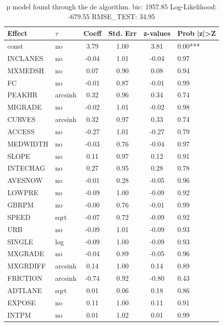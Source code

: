 \begin{table}
	\caption{p model found through the de algorithm. bic: 1957.85 Log-Likelihood: -679.55 RMSE_TEST: 34.95}
	\begin{center}
		\begin{tabular}{|l|l|c|c|c|l|}
			\hline
			Effect & $\tau$ & Coeff & Std. Err & z-values & Prob |z|>Z \\
			\hline
			const & no & 3.79 & 1.00 & 3.81 & 0.00*** \\
			\hline
			INCLANES & no & -0.04 & 1.01 & -0.04 & 0.97 \\
			\hline
			MXMEDSH & no & 0.07 & 0.90 & 0.08 & 0.94 \\
			\hline
			FC & no & -0.01 & 0.87 & -0.01 & 0.99 \\
			\hline
			PEAKHR & arcsinh & 0.32 & 0.96 & 0.34 & 0.74 \\
			\hline
			MIGRADE & no & -0.02 & 1.01 & -0.02 & 0.98 \\
			\hline
			CURVES & arcsinh & 0.32 & 0.97 & 0.33 & 0.74 \\
			\hline
			ACCESS & no & -0.27 & 1.01 & -0.27 & 0.79 \\
			\hline
			MEDWIDTH & no & -0.03 & 0.76 & -0.04 & 0.97 \\
			\hline
			SLOPE & no & 0.11 & 0.97 & 0.12 & 0.91 \\
			\hline
			INTECHAG & no & 0.27 & 0.95 & 0.28 & 0.78 \\
			\hline
			AVESNOW & no & -0.01 & 0.28 & -0.05 & 0.96 \\
			\hline
			LOWPRE & no & -0.09 & 1.00 & -0.09 & 0.92 \\
			\hline
			GBRPM & no & -0.00 & 0.76 & -0.01 & 0.99 \\
			\hline
			SPEED & sqrt & -0.07 & 0.72 & -0.09 & 0.92 \\
			\hline
			URB & no & -0.09 & 1.01 & -0.09 & 0.93 \\
			\hline
			SINGLE & log & -0.09 & 1.00 & -0.09 & 0.93 \\
			\hline
			MXGRADE & no & -0.04 & 0.89 & -0.05 & 0.96 \\
			\hline
			MXGRDIFF & arcsinh & 0.14 & 1.00 & 0.14 & 0.89 \\
			\hline
			FRICTION & arcsinh & -0.74 & 0.92 & -0.80 & 0.43 \\
			\hline
			ADTLANE & sqrt & 0.01 & 0.06 & 0.18 & 0.86 \\
			\hline
			EXPOSE & no & 0.11 & 1.00 & 0.11 & 0.91 \\
			\hline
			INTPM & no & 0.01 & 1.02 & 0.01 & 0.99 \\

\end{tabular}
\end{center}
\end{table}
